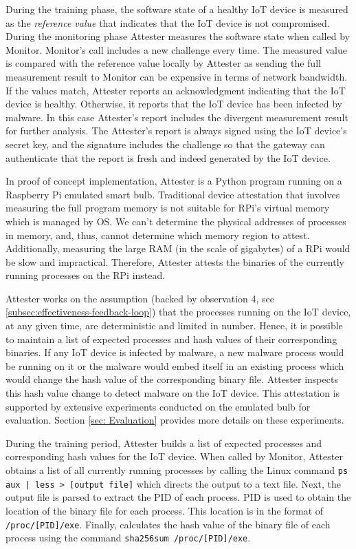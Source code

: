 During the training phase, the software state of a healthy IoT device is measured as the \textit{reference value} that indicates that the IoT device is not compromised. During the monitoring phase Attester measures the software state when called by Monitor. Monitor's call includes a new challenge every time. The measured value is compared with the reference value locally by Attester as sending the full measurement result to Monitor can be expensive in terms of network bandwidth. 
If the values match, Attester reports an acknowledgment indicating that the IoT device is healthy. Otherwise, it reports that the IoT device has been infected by malware. In this case Attester's report includes the divergent measurement result for further analysis.
The Attester's report is always signed using the IoT device's secret key, and the signature includes the challenge so that the gateway can authenticate that the report is fresh and indeed generated by the IoT device.

In \system{} proof of concept implementation, Attester is a Python program running on a Raspberry Pi emulated smart bulb. Traditional device attestation that involves measuring the full program memory is not suitable for RPi's virtual memory which is managed by OS. We can't determine the physical addresses of processes in memory, and, thus, cannot determine which memory region to attest. Additionally, measuring the large RAM (in the scale of gigabytes) of a RPi would be slow and impractical. Therefore, Attester attests the binaries of the currently running processes on the RPi instead. 

Attester works on the assumption (backed by observation 4, see \ref{subsec:effectiveness-feedback-loop}) that the processes running on the IoT device, at any given time, are deterministic and limited in number. Hence, it is possible to maintain a list of expected processes and hash values of their corresponding binaries. If any IoT device is infected by malware, a new malware process would be running on it or the malware would embed itself in an existing process which would change the hash value of the corresponding binary file. Attester inspects this hash value change to detect malware on the IoT device. This attestation is supported by extensive experiments conducted on the emulated bulb for evaluation. Section \ref{sec: Evaluation} provides more details on these experiments.

During the training period, Attester builds a list of expected processes and corresponding hash values for the IoT device. 
When called by Monitor, Attester obtains a list of all currently running processes by calling the Linux command \texttt{ps aux | less > [output file]} which directs the output to a text file. Next, the output file is parsed to extract the PID of each process. PID is used to obtain the location of the binary file for each process. This location is in the format of \texttt{/proc/[PID]/exe}. Finally, \system{} calculates the hash value of the binary file of each process using the command \texttt{sha256sum /proc/[PID]/exe}.  


